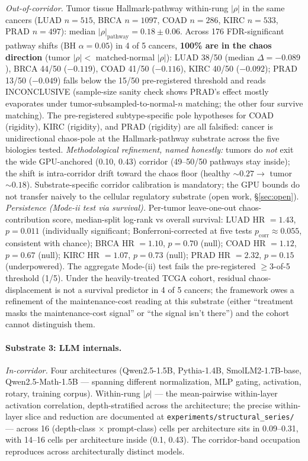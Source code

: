 \documentclass[11pt,a4paper]{article}
\begin{document}
\emph{Out-of-corridor.} Tumor tissue Hallmark-pathway within-rung $|\rho|$ in the same cancers (LUAD $n=515$, BRCA $n=1097$, COAD $n=286$, KIRC $n=533$, PRAD $n=497$): median $|\rho|_{\text{pathway}} = 0.18 \pm 0.06$. Across 176 FDR-significant pathway shifts (BH $\alpha = 0.05$) in 4 of 5 cancers, \textbf{100\% are in the chaos direction} (tumor $|\rho| <$ matched-normal $|\rho|$): LUAD 38/50 (median $\Delta = -0.089$), BRCA 44/50 ($-0.119$), COAD 41/50 ($-0.116$), KIRC 40/50 ($-0.092$); PRAD 13/50 ($-0.049$) falls below the 15/50 pre-registered threshold and reads INCONCLUSIVE (sample-size sanity check shows PRAD's effect mostly evaporates under tumor-subsampled-to-normal-$n$ matching; the other four survive matching). The pre-registered subtype-specific pole hypotheses for COAD (rigidity), KIRC (rigidity), and PRAD (rigidity) are all falsified: cancer is unidirectional chaos-pole at the Hallmark-pathway substrate across the five biologies tested. \emph{Methodological refinement, named honestly:} tumors do \emph{not} exit the wide GPU-anchored (0.10, 0.43) corridor (49--50/50 pathways stay inside); the shift is intra-corridor drift toward the chaos floor (healthy $\sim 0.27 \to$ tumor $\sim 0.18$). Substrate-specific corridor calibration is mandatory; the GPU bounds do not transfer naively to the cellular regulatory substrate (open work, \S\ref{sec:open}). \emph{Persistence (Mode-ii test via survival).} Per-tumor leave-one-out chaos-contribution score, median-split log-rank vs overall survival: LUAD HR $= 1.43$, $p = 0.011$ (individually significant; Bonferroni-corrected at five tests $p_{\text{corr}} \approx 0.055$, consistent with chance); BRCA HR $= 1.10$, $p = 0.70$ (null); COAD HR $= 1.12$, $p = 0.67$ (null); KIRC HR $= 1.07$, $p = 0.73$ (null); PRAD HR $= 2.32$, $p = 0.15$ (underpowered). The aggregate Mode-(ii) test fails the pre-registered $\ge 3$-of-5 threshold (1/5). Under the heavily-treated TCGA cohort, residual chaos-displacement is not a survival predictor in 4 of 5 cancers; the framework owes a refinement of the maintenance-cost reading at this substrate (either ``treatment masks the maintenance-cost signal'' or ``the signal isn't there'') and the cohort cannot distinguish them.

\paragraph{Substrate 3: LLM internals.}

\emph{In-corridor.} Four architectures (Qwen2.5-1.5B, Pythia-1.4B, SmolLM2-1.7B-base, Qwen2.5-Math-1.5B --- spanning different normalization, MLP gating, activation, rotary, training corpus). Within-rung $|\rho|$ --- the mean-pairwise within-layer activation correlation, depth-stratified across the architecture; the precise within-layer slice and reduction are documented at \texttt{experiments/structural\_series/} --- across 16 (depth-class $\times$ prompt-class) cells per architecture sits in 0.09--0.31, with 14--16 cells per architecture inside (0.1, 0.43). The corridor-band occupation reproduces across architecturally distinct models.
\end{document}
